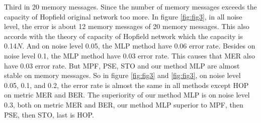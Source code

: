 \begin{figure*}[!h]
  \caption{Memory15}
  \label{fig:fig2}
\end{figure*}
%

Third in 20 memory messages. Since the number of memory messages exceeds the capacity of Hopfield original network too more. In figure \ref{fig:fig3}, in all noise level, the error is about 12 memory messages of 20 memory messages. This also accords with the theory of capacity of Hopfield network which the capacity is 0.14$N$. And on noise level 0.05, the MLP method have 0.06 error rate. Besides on noise level 0.1, the MLP method have 0.03 error rate. This causes that MER also have 0.03 error rate.  But MPF, PSE, STO and our method MLP are almost stable on memory messages. So in figure \ref{fig:fig3} and \ref{fig:fig3}, on noise level 0.05, 0.1, and 0.2, the error rate is almost the same in all methods except HOP on metric MER and BER. The superiority of our method MLP is on noise level 0.3, both on metric MER and BER, our method MLP superior to MPF, then PSE, then STO, last is HOP.

\begin{figure*}[!h]
  \caption{Memory20}
  \label{fig:fig3}
\end{figure*}


